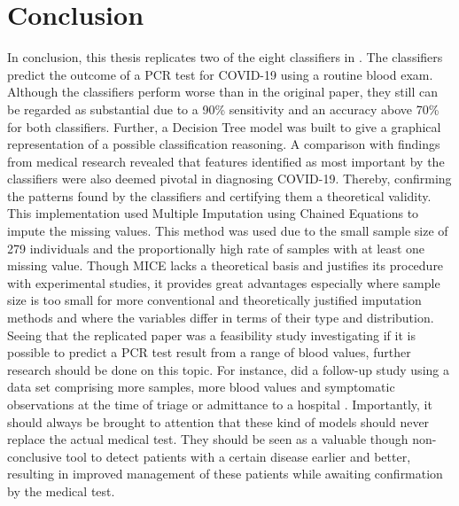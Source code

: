 \section{Conclusion}
In conclusion, this thesis replicates two of the eight classifiers in 
\cite{RN127}. The classifiers predict the outcome of a PCR test for COVID-19 
using a routine blood exam. Although the classifiers perform worse than in the 
original paper, they still can be regarded as substantial due to a 90\% 
sensitivity and an accuracy above 70\% for both classifiers.
Further, a Decision Tree model was built to give a graphical representation of 
a possible classification reasoning.
A comparison with findings from medical research revealed that features 
identified as most important by the classifiers were also deemed pivotal in 
diagnosing COVID-19. Thereby, confirming the patterns found by the classifiers 
and certifying them a theoretical validity.
This implementation used Multiple Imputation using Chained Equations to impute 
the missing values. This method was used due to the small sample size of 279 
individuals and the proportionally high rate of samples with at least one 
missing value. Though MICE lacks a theoretical basis and justifies its 
procedure with experimental studies, it provides great advantages especially 
where sample size is too small for more conventional and theoretically 
justified imputation methods and where the variables differ in terms of their 
type and distribution.
Seeing that the replicated paper was a feasibility study investigating if it is 
possible to predict a PCR test result from a range of blood values, further 
research should be done on this topic. For instance, \citeauthor{RN127} did a 
follow-up study using a data set comprising more samples, more blood values and 
symptomatic observations at the time of triage or admittance to a hospital 
\cite{RN179}.
Importantly, it should always be brought to attention that these kind of models 
should never replace the actual medical test. They should be seen as a valuable 
though non-conclusive tool to detect patients with a certain disease earlier 
and better, resulting in improved management of these patients while awaiting 
confirmation by the medical test.
